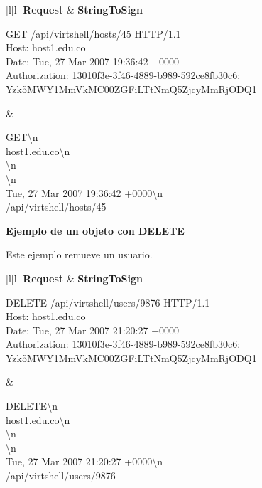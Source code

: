 \begin{tabular}{|l|l|} \hline
\textbf{Request} & \textbf{StringToSign} \\ \hline
{}%
{\raggedright GET /api/virtshell/hosts/45 HTTP/1.1 \\
 Host: host1.edu.co \\
 Date: Tue, 27 Mar 2007 19:36:42 +0000 \\
 Authorization: 13010f3e-3f46-4889-b989-592ce8fb30c6: Yzk5MWY1MmVkMC00ZGFiLTtNmQ5ZjcyMmRjODQ1 } & %
{\raggedright GET\textbackslash{}n \\
 host1.edu.co\textbackslash{}n \\
 \textbackslash{}n \\
 \textbackslash{}n \\
 Tue, 27 Mar 2007 19:36:42 +0000\textbackslash{}n \\ /api/virtshell/hosts/45} \tabularnewline \hline
\end{tabular}

\textbf{Ejemplo de un objeto con DELETE}

Este ejemplo remueve un usuario.

\begin{tabular}{|l|l|} \hline
\textbf{Request} & \textbf{StringToSign} \\ \hline
{}%
{\raggedright DELETE /api/virtshell/users/9876 HTTP/1.1 \\
 Host: host1.edu.co \\
 Date: Tue, 27 Mar 2007 21:20:27 +0000 \\
 Authorization: 13010f3e-3f46-4889-b989-592ce8fb30c6: Yzk5MWY1MmVkMC00ZGFiLTtNmQ5ZjcyMmRjODQ1 } & %
{\raggedright DELETE\textbackslash{}n \\
 host1.edu.co\textbackslash{}n \\
 \textbackslash{}n \\
 \textbackslash{}n \\
 Tue, 27 Mar 2007 21:20:27 +0000\textbackslash{}n \\ /api/virtshell/users/9876} \tabularnewline \hline
\end{tabular}
